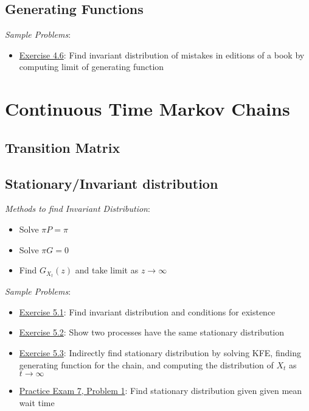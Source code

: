 \documentclass[12pt]{article}
\begin{document}
\subsection{Generating Functions}
\textit{Sample Problems}: 
\begin{itemize}[nolistsep]
    \item \hyperref[Exercise 4.6]{Exercise 4.6}: Find invariant distribution of mistakes in editions of a book by computing limit of generating function
\end{itemize}





\pagebreak
\section{Continuous Time Markov Chains}

\subsection{Transition Matrix}


\subsection{Stationary/Invariant distribution}
\textit{Methods to find Invariant Distribution}:
\begin{itemize}[nolistsep]
    \item Solve \( \pi P = \pi \)
    \item Solve \( \pi G = 0 \)
    \item Find \( G_{X_t}(z) \) and take limit as \( z\to\infty \) 
\end{itemize}

\textit{Sample Problems}: 
\begin{itemize}[nolistsep]
    \item \hyperref[Exercise 5.1]{Exercise 5.1}: Find invariant distribution and conditions for existence
    \item \hyperref[Exercise 5.2]{Exercise 5.2}: Show two processes have the same stationary distribution 
    \item \hyperref[Exercise 5.3]{Exercise 5.3}: Indirectly find stationary distribution by solving KFE, finding generating function for the chain, and computing the distribution of \( X_t \) as \( t\to\infty \)
    \item \hyperref[Practice Exam 7, Problem 1]{Practice Exam 7, Problem 1}: Find stationary distribution given given mean wait time
\end{itemize}
\end{document}
